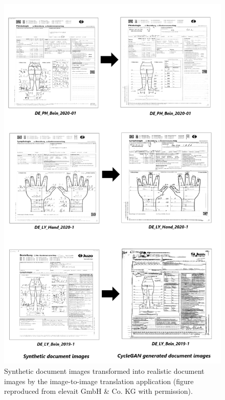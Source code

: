 \begin{figure}[H]
        \begin{center}
	    \includegraphics[scale=0.30]{images/Evaluation/Qualitative_Results_1.png}
	    \caption[Synthetic document images transformed into realistic document images by the image-to-image translation application.]{Synthetic document images transformed into realistic document images by the image-to-image translation application (figure reproduced from elevait GmbH \& Co. KG with permission).}
	    \label{fig:QualitativeResults1}
	    \end{center}
\end{figure}








